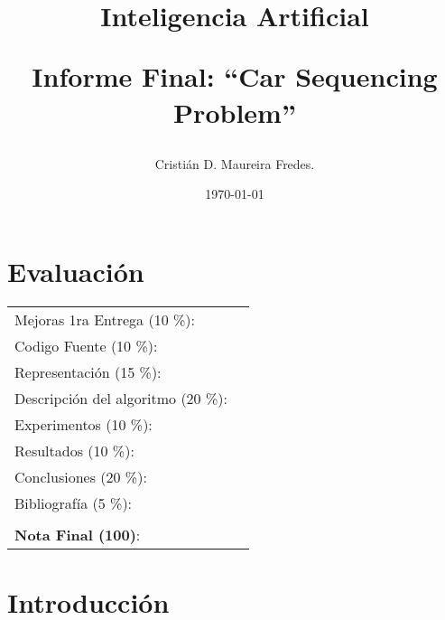 \documentclass[letter, 10pt]{article}
\begin{document}

\pagestyle{empty}

\title{Inteligencia Artificial \\ \begin{Large}Informe Final: ``Car Sequencing Problem''\end{Large}}
\author{Cristián D. Maureira Fredes.}
\date{\today}
\maketitle


\section*{Evaluación}

\begin{tabular}{ll}
Mejoras 1ra Entrega (10 \%): &  \underline{\hspace{2cm}}\\
Codigo Fuente (10 \%): &  \underline{\hspace{2cm}}\\
Representaci\'on (15 \%):  & \underline{\hspace{2cm}} \\
Descripci\'on del algoritmo (20 \%):  & \underline{\hspace{2cm}} \\
Experimentos (10 \%):  & \underline{\hspace{2cm}} \\
Resultados (10 \%):  & \underline{\hspace{2cm}} \\
Conclusiones (20 \%): &  \underline{\hspace{2cm}}\\
Bibliograf\'ia (5 \%): & \underline{\hspace{2cm}}\\
&  \\
\textbf{Nota Final (100)}:   & \underline{\hspace{2cm}}
\end{tabular}

\begin{abstract}

\end{abstract}

\section{Introducción}
\label{sec:introduccion}

\end{document}
